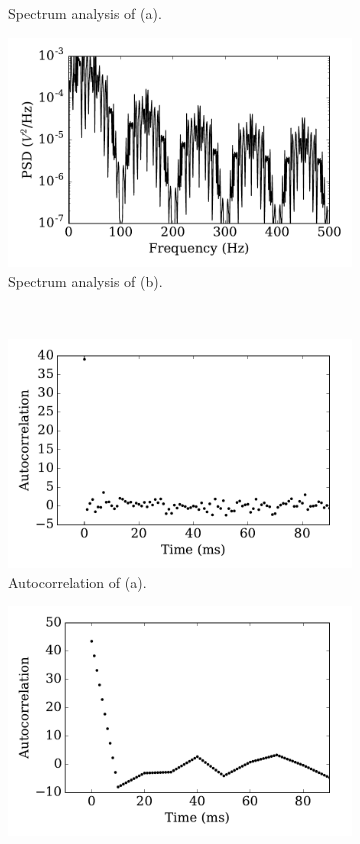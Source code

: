 \documentclass[runningheads,a4paper]{llncs}
\begin{document}
\begin{figure}[tbp!]
\begin{subfigure}[t]{0.43\textwidth}
		\caption{Spectrum analysis of (a).}
	\end{subfigure}
	\begin{subfigure}[t]{0.43\textwidth}
		\includegraphics[width=\textwidth]{psd_dt10.pdf}
		\caption{Spectrum analysis of (b).}
	\end{subfigure}\\
	\begin{subfigure}[t]{0.43\textwidth}
		\includegraphics[width=\textwidth]{autocorr_dt1.pdf}
		\caption{Autocorrelation of (a).}
	\end{subfigure}
	\begin{subfigure}[t]{0.43\textwidth}
		\includegraphics[width=\textwidth]{autocorr_dt10.pdf}

\end{subfigure}
\end{figure}
\end{document}
